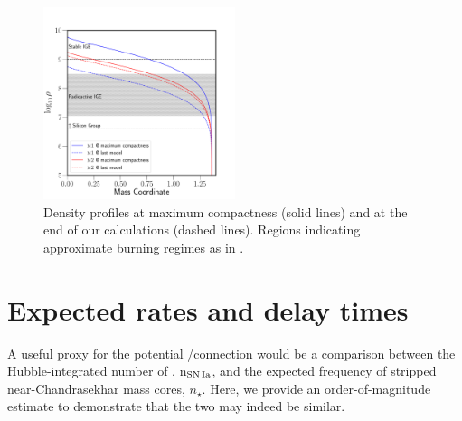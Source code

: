 \documentclass[../../main/thesis_msc.tex]{subfiles}
\begin{document}
\begin{figure}
\begin{center}
\includegraphics[width=0.5\textwidth]{../figures/chapter3/composition.pdf}
\caption{Density profiles at maximum compactness (solid lines) and at the end of our \mesa calculations (dashed lines). Regions indicating approximate burning regimes as in \cite{Seitenzahl2017}.}
\label{fig:nuc}
\end{center}
\end{figure}


\section{Expected rates and delay times}\label{sec:4}
A useful proxy for the potential \one/\ia connection would be a comparison between 
the  Hubble-integrated number of \ias, n$_{\rm SN\,Ia}$, and the expected frequency  of stripped  near-Chandrasekhar mass \one cores, $n_\star$. Here, we provide an
order-of-magnitude estimate to demonstrate that the two may indeed be similar. 
\end{document}
